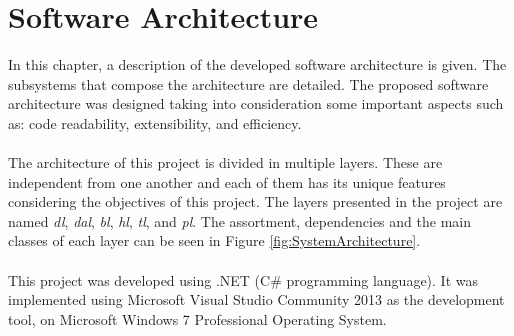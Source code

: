 \chapter{Software Architecture}
\label{chap:Architecture}
\thispagestyle{plain}

In this chapter, a description of the developed software architecture is given. The subsystems that compose the architecture are detailed. The proposed software architecture was designed taking into consideration some important aspects such as: code readability, extensibility, and efficiency.\\
\\
The architecture of this project is divided in multiple layers. These are independent from one another and each of them has its unique features considering the objectives of this project. The layers presented in the project are named \textit{\gls{dl}}, \textit{\gls{dal}}, \textit{\gls{bl}}, \textit{\gls{hl}}, \textit{\gls{tl}}, and \textit{\gls{pl}}. The assortment, dependencies and the main classes of each layer can be seen in Figure \ref{fig:SystemArchitecture}.\\
\\
This project was developed using .NET (C\# programming language). It was implemented using Microsoft Visual Studio Community 2013 as the development tool, on Microsoft Windows 7 Professional Operating System.

